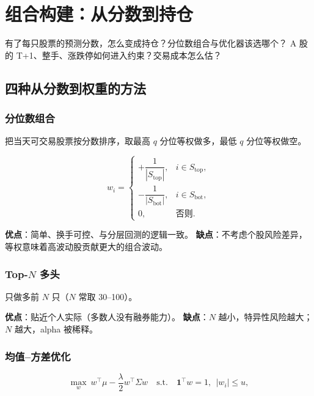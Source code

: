\chapter{组合构建：从分数到持仓}\label{ch:portfolio}

\begin{keybox}[本章要回答的问题]
有了每只股票的预测分数，怎么变成持仓？分位数组合与优化器该选哪个？
A 股的 T+1、整手、涨跌停如何进入约束？交易成本怎么估？
\end{keybox}

\section{四种从分数到权重的方法}

\subsection{分位数组合}

把当天可交易股票按分数排序，取最高 $q$ 分位等权做多，最低 $q$ 分位等权做空。

\begin{equation}
  w_i = \begin{cases}
    +\dfrac{1}{|S_{\text{top}}|}, & i \in S_{\text{top}}, \\[6pt]
    -\dfrac{1}{|S_{\text{bot}}|}, & i \in S_{\text{bot}}, \\[6pt]
    0, & \text{否则}.
  \end{cases}
\end{equation}

\textbf{优点}：简单、换手可控、与分层回测的逻辑一致。
\textbf{缺点}：不考虑个股风险差异，等权意味着高波动股贡献更大的组合波动。

\subsection{Top-$N$ 多头}

只做多前 $N$ 只（$N$ 常取 30--100）。

\textbf{优点}：贴近个人实际（多数人没有融券能力）。
\textbf{缺点}：$N$ 越小，特异性风险越大；$N$ 越大，alpha 被稀释。

\subsection{均值--方差优化}

\begin{equation}
  \max_{w}\ w^\top \mu - \frac{\lambda}{2}w^\top \Sigma w
  \quad \text{s.t.}\quad \mathbf{1}^\top w = 1,\ \ |w_i| \le u,
\end{equation}

